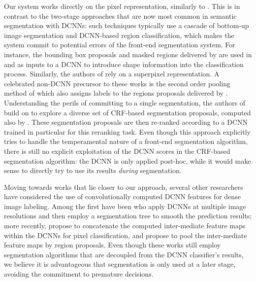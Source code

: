 

Our system works directly on the pixel representation, similarly to \citet{long2014fully}. This is in contrast to the two-stage approaches that are now most common in semantic segmentation with DCNNs: such techniques typically use a cascade of bottom-up image segmentation and DCNN-based region classification, which makes the system commit to potential errors of the front-end segmentation system.  
For instance, the bounding box proposals and masked regions delivered by \citep{arbelaez2014multiscale, Uijlings13} are used in 
\citet{girshick2014rcnn} and \cite{hariharan2014simultaneous}  as inputs to a DCNN to introduce  shape information into the classification process. Similarly, the authors of  \citet{mostajabi2014feedforward} rely on a superpixel representation. A celebrated  non-DCNN precursor to these  works
is the second order pooling method of \citep{carreira2012semantic} which also assigns labels to the regions proposals delivered by \citep{carreira2012cpmc}. 
Understanding the perils of committing to a single segmentation, the authors of \citet{cogswell2014combining} 
build on \citep{yadollahpour2013discriminative} to explore a diverse set of CRF-based segmentation proposals, computed also by \citep{carreira2012cpmc}. These segmentation proposals are then re-ranked according to a DCNN trained in  particular for this reranking task. Even though this approach explicitly tries to handle the temperamental nature of a front-end segmentation algorithm, there is still no explicit exploitation of the DCNN scores in  the CRF-based segmentation algorithm: the DCNN is only applied post-hoc, while it would make sense to directly try to use its results {\em during} segmentation. 

Moving towards works that lie closer to our approach, several other researchers have considered the use of convolutionally computed DCNN features for dense image labeling. Among the first have been
\citet{farabet2013learning} who apply DCNNs at multiple image resolutions and then employ a segmentation tree to smooth the prediction results; more recently, \citet{hariharan2014hypercolumns} propose to concatenate the computed inter-mediate feature maps within the DCNNs for pixel classification, and \citet{dai2014convolutional} propose to pool the inter-mediate feature maps by region proposals. Even though these works still employ  segmentation algorithms that are  decoupled from the DCNN classifier's results, we believe it is advantageous that segmentation is only used at a later stage, avoiding the commitment  to premature decisions. 

